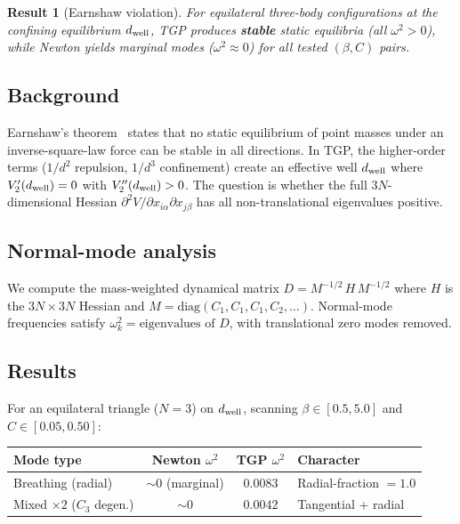 \documentclass[11pt,a4paper]{article}
\newcommand{\dwell}{d_{\rm well}}
\newtheorem{result}{Result}
\begin{document}
\begin{result}[Earnshaw violation]
For equilateral three-body configurations at the confining equilibrium
$\dwell$, TGP produces \textbf{stable} static equilibria (all
$\omega^2 > 0$), while Newton yields marginal modes
($\omega^2 \approx 0$) for all tested $(\beta, C)$ pairs.
\end{result}

\subsection{Background}

Earnshaw's theorem~\citep{Earnshaw1842} states that no static
equilibrium of point masses under an inverse-square-law force can be
stable in all directions.
In TGP, the higher-order terms ($1/d^2$ repulsion, $1/d^3$ confinement)
create an effective well $\dwell$ where $V'_2(\dwell) = 0$ with
$V''_2(\dwell) > 0$.  The question is whether the full $3N$-dimensional
Hessian $\partial^2 V/\partial x_{i\alpha}\partial x_{j\beta}$ has all
non-translational eigenvalues positive.

\subsection{Normal-mode analysis}

We compute the mass-weighted dynamical matrix
$D = M^{-1/2}\,H\,M^{-1/2}$ where $H$ is the $3N \times 3N$ Hessian
and $M = \mathrm{diag}(C_1, C_1, C_1, C_2, \ldots)$.  Normal-mode
frequencies satisfy $\omega_k^2 = \text{eigenvalues of } D$, with
translational zero modes removed.

\subsection{Results}

For an equilateral triangle ($N=3$) on $\dwell$, scanning
$\beta \in [0.5, 5.0]$ and $C \in [0.05, 0.50]$:

\begin{center}
\begin{tabular}{lccl}
  \toprule
  \textbf{Mode type} & \textbf{Newton $\omega^2$} & \textbf{TGP $\omega^2$}
    & \textbf{Character} \\
  \midrule
  Breathing (radial) & $\sim 0$ (marginal) & $0.0083$ & Radial-fraction $= 1.0$ \\
  Mixed $\times 2$ ($C_3$ degen.)  & $\sim 0$ & $0.0042$ & Tangential + radial \\
  \bottomrule
\end{tabular}
\end{center}
\end{document}
